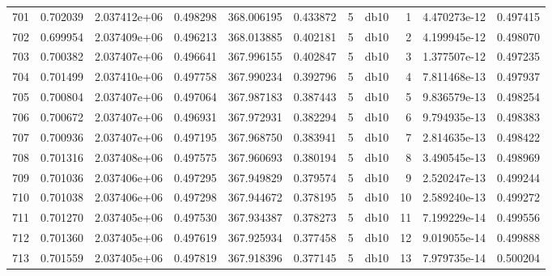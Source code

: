 \begin{tabular}{lrrrrrrlrrr}
701  &    0.702039 &        2.037412e+06 &  0.498298 &              368.006195 &    0.433872 &       5 &         db10 &      1 &   4.470273e-12 &      0.497415 \\
702  &    0.699954 &        2.037409e+06 &  0.496213 &              368.013885 &    0.402181 &       5 &         db10 &      2 &   4.199945e-12 &      0.498070 \\
703  &    0.700382 &        2.037407e+06 &  0.496641 &              367.996155 &    0.402847 &       5 &         db10 &      3 &   1.377507e-12 &      0.497235 \\
704  &    0.701499 &        2.037410e+06 &  0.497758 &              367.990234 &    0.392796 &       5 &         db10 &      4 &   7.811468e-13 &      0.497937 \\
705  &    0.700804 &        2.037407e+06 &  0.497064 &              367.987183 &    0.387443 &       5 &         db10 &      5 &   9.836579e-13 &      0.498254 \\
706  &    0.700672 &        2.037407e+06 &  0.496931 &              367.972931 &    0.382294 &       5 &         db10 &      6 &   9.794935e-13 &      0.498383 \\
707  &    0.700936 &        2.037407e+06 &  0.497195 &              367.968750 &    0.383941 &       5 &         db10 &      7 &   2.814635e-13 &      0.498422 \\
708  &    0.701316 &        2.037408e+06 &  0.497575 &              367.960693 &    0.380194 &       5 &         db10 &      8 &   3.490545e-13 &      0.498969 \\
709  &    0.701036 &        2.037406e+06 &  0.497295 &              367.949829 &    0.379574 &       5 &         db10 &      9 &   2.520247e-13 &      0.499244 \\
710  &    0.701038 &        2.037406e+06 &  0.497298 &              367.944672 &    0.378195 &       5 &         db10 &     10 &   2.589240e-13 &      0.499272 \\
711  &    0.701270 &        2.037405e+06 &  0.497530 &              367.934387 &    0.378273 &       5 &         db10 &     11 &   7.199229e-14 &      0.499556 \\
712  &    0.701360 &        2.037405e+06 &  0.497619 &              367.925934 &    0.377458 &       5 &         db10 &     12 &   9.019055e-14 &      0.499888 \\
713  &    0.701559 &        2.037405e+06 &  0.497819 &              367.918396 &    0.377145 &       5 &         db10 &     13 &   7.979735e-14 &      0.500204 \\

\end{tabular}
